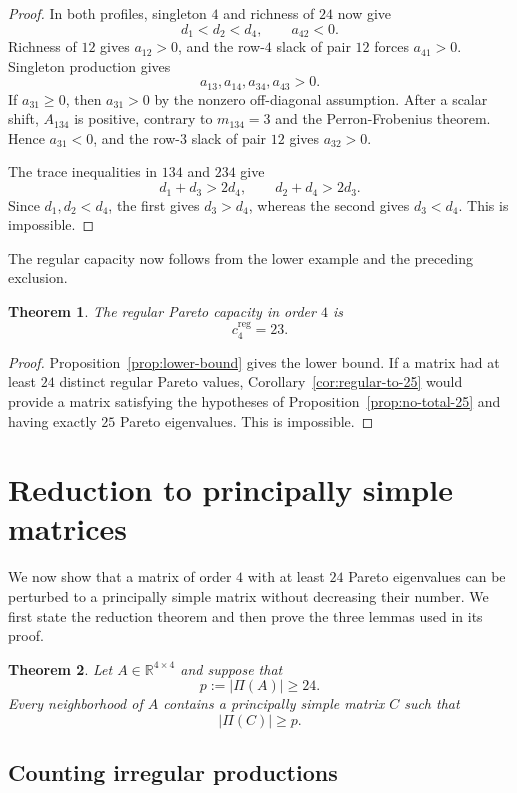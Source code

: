 \documentclass[11pt,a4paper]{article}
\newtheorem{theorem}{Theorem}[section]
\theoremstyle{definition}
\newcommand{\R}{\mathbb R}
\begin{document}
\begin{proof}
In both profiles, singleton $4$ and richness of $24$ now give
$$
d_1<d_2<d_4,
\qquad
a_{42}<0.
$$
Richness of $12$ gives $a_{12}>0$, and the row-$4$ slack of pair $12$
forces $a_{41}>0$. Singleton production gives
$$
a_{13},a_{14},a_{34},a_{43}>0.
$$
If $a_{31}\geq0$, then $a_{31}>0$ by the nonzero off-diagonal
assumption. After a scalar shift, $A_{134}$ is positive, contrary to
$m_{134}=3$ and the Perron-Frobenius theorem. Hence $a_{31}<0$, and
the row-$3$ slack of pair $12$ gives $a_{32}>0$.

The trace inequalities in $134$ and $234$ give
$$
d_1+d_3>2d_4,
\qquad
d_2+d_4>2d_3.
$$
Since $d_1,d_2<d_4$, the first gives $d_3>d_4$, whereas the second
gives $d_3<d_4$. This is impossible.
\end{proof}

The regular capacity now follows from the lower example and the
preceding exclusion.

\begin{theorem}
\label{thm:regular-capacity}
The regular Pareto capacity in order $4$  is
$$
c_4^{\mathrm{reg}}=23.
$$
\end{theorem}

\begin{proof}
Proposition~\ref{prop:lower-bound} gives the lower bound. If a matrix
had at least $24$ distinct regular Pareto values,
Corollary~\ref{cor:regular-to-25} would provide a matrix satisfying the
hypotheses of Proposition~\ref{prop:no-total-25} and having exactly
$25$ Pareto eigenvalues. This is impossible.
\end{proof}

\section{Reduction to principally simple matrices}
\label{sec:nonregular}

We now show that a matrix of order $4$  with at least $24$ Pareto
eigenvalues can be perturbed to a principally simple matrix without
decreasing their number. We first state the reduction theorem and then
prove the three lemmas used in its proof.

\begin{theorem}
\label{thm:reduction-to-principal}
Let $A\in\R^{4\times4}$ and suppose that
$$
p:=|\Pi(A)|\geq24.
$$
Every neighborhood of $A$ contains a principally simple matrix $C$
such that
$$
|\Pi(C)|\geq p.
$$
\end{theorem}

\subsection{Counting irregular productions}
\end{document}
